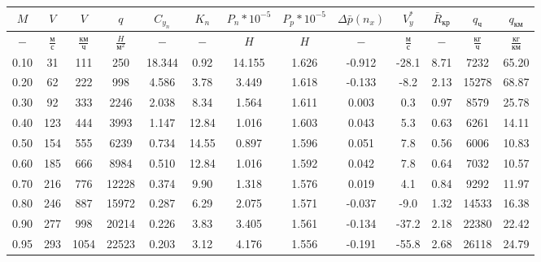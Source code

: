 \begin{tabular}{|c|c|c|c|c|c|c|c|c|c|c|c|c|}
\hline
$M$ & $V$ & $V$ & $q$ & $C_{y_n}$ & $K_n$ & $P_n*10^{-5}$ & $P_p*10^{-5}$ & $\Delta \bar{p}(n_x)$ & $V_y^*$ & $\bar{R}_{кр}$ & $q_{ч}$ & $q_{км}$ \\ 
\hline
$-$ & $\frac{м}{с}$ & $\frac{км}{ч}$ & $\frac{H}{м^2}$ & $-$ & $-$ & $H$ & $H$ & $-$ & $\frac{м}{с}$ & $-$ & $\frac{кг}{ч}$ & $\frac{кг}{км}$ \\ 
\hline
0.10 & 31 & 111 & 250 & 18.344 & 0.92 & 14.155 & 1.626 & -0.912 & -28.1 & 8.71 & 7232 & 65.20 \\ 
\hline
0.20 & 62 & 222 & 998 & 4.586 & 3.78 & 3.449 & 1.618 & -0.133 & -8.2 & 2.13 & 15278 & 68.87 \\ 
\hline
0.30 & 92 & 333 & 2246 & 2.038 & 8.34 & 1.564 & 1.611 & 0.003 & 0.3 & 0.97 & 8579 & 25.78 \\ 
\hline
0.40 & 123 & 444 & 3993 & 1.147 & 12.84 & 1.016 & 1.603 & 0.043 & 5.3 & 0.63 & 6261 & 14.11 \\ 
\hline
0.50 & 154 & 555 & 6239 & 0.734 & 14.55 & 0.897 & 1.596 & 0.051 & 7.8 & 0.56 & 6006 & 10.83 \\ 
\hline
0.60 & 185 & 666 & 8984 & 0.510 & 12.84 & 1.016 & 1.592 & 0.042 & 7.8 & 0.64 & 7032 & 10.57 \\ 
\hline
0.70 & 216 & 776 & 12228 & 0.374 & 9.90 & 1.318 & 1.576 & 0.019 & 4.1 & 0.84 & 9292 & 11.97 \\ 
\hline
0.80 & 246 & 887 & 15972 & 0.287 & 6.29 & 2.075 & 1.571 & -0.037 & -9.0 & 1.32 & 14533 & 16.38 \\ 
\hline
0.90 & 277 & 998 & 20214 & 0.226 & 3.83 & 3.405 & 1.561 & -0.134 & -37.2 & 2.18 & 22380 & 22.42 \\ 
\hline
0.95 & 293 & 1054 & 22523 & 0.203 & 3.12 & 4.176 & 1.556 & -0.191 & -55.8 & 2.68 & 26118 & 24.79 \\ 
\hline
\end{tabular}